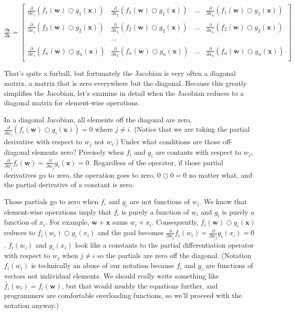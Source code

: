 \documentclass[11pt]{article}
\begin{document}
$
\frac{\partial \mathbf{y}}{\partial \mathbf{x}}  = \begin{bmatrix}
\frac{\partial}{\partial x_1} ( f_{1}(\mathbf{w}) \bigcirc g_{1}(\mathbf{x}) ) & \frac{\partial}{\partial x_2} ( f_{1}(\mathbf{w}) \bigcirc g_{1}(\mathbf{x}) ) & \ldots & \frac{\partial}{\partial x_n} ( f_{1}(\mathbf{w}) \bigcirc g_{1}(\mathbf{x}) )\\\\
\frac{\partial}{\partial x_1} ( f_{2}(\mathbf{w}) \bigcirc g_{2}(\mathbf{x}) ) & \frac{\partial}{\partial x_2} ( f_{2}(\mathbf{w}) \bigcirc g_{2}(\mathbf{x}) ) & \ldots & \frac{\partial}{\partial x_n} ( f_{2}(\mathbf{w}) \bigcirc g_{2}(\mathbf{x}) )\\\\
& \ldots\\\\
\frac{\partial}{\partial x_1} ( f_{n}(\mathbf{w}) \bigcirc g_{n}(\mathbf{x}) ) & \frac{\partial}{\partial x_2} ( f_{n}(\mathbf{w}) \bigcirc g_{n}(\mathbf{x}) ) & \ldots & \frac{\partial}{\partial x_n} ( f_{n}(\mathbf{w}) \bigcirc g_{n}(\mathbf{x}) )\\
\end{bmatrix}
$

That's quite a furball, but fortunately the Jacobian is very often a diagonal matrix, a matrix that is zero everywhere but the diagonal. Because this greatly simplifies the Jacobian, let's examine in detail when the Jacobian reduces to a diagonal matrix for element-wise operations. 

In a diagonal Jacobian, all elements off the diagonal are zero, $\frac{\partial}{\partial w_j} ( f_i(\mathbf{w}) \bigcirc g_i(\mathbf{x}) ) = 0$ where $j \neq i$. (Notice that we are taking the partial derivative with respect to $w_j$ not $w_i$.) Under what conditions are those off-diagonal elements zero? Precisely when $f_i$ and $g_i$ are contants with respect to $w_j$, $\frac{\partial}{\partial w_j} f_i(\mathbf{w}) = \frac{\partial}{\partial w_j} g_i(\mathbf{x}) = 0$.  Regardless of the operator, if those partial derivatives go to zero, the operation goes to zero, $0 \bigcirc 0 = 0$ no matter what, and the partial derivative of a constant is zero.

Those partials go to zero when $f_i$ and $g_i$ are not functions of $w_j$. We know that element-wise operations imply that $f_i$ is purely a function of $w_i$ and $g_i$  is purely a function of $x_i$. For example, $\mathbf{w}+\mathbf{x}$ sums $w_i + x_i$. Consequently,  $f_i(\mathbf{w}) \bigcirc g_i(\mathbf{x})$ reduces to $f_i(w_i) \bigcirc g_i(x_i)$ and the goal becomes $\frac{\partial}{\partial w_j} f_i(w_i) = \frac{\partial}{\partial w_j} g_i(x_i) = 0$. $f_i(w_i)$ and $g_i(x_i)$ look like a constants to the partial differentiation operator with respect to $w_j$ when $j \neq i$ so the partials are zero off the diagonal. (Notation $f_i(w_i)$ is technically an abuse of our notation because $f_i$ and $g_i$ are functions of vectors not individual elements. We should really write something like $\hat f_{i}(w_i) = f_{i}(\mathbf{w})$, but that would muddy the equations further, and programmers are comfortable overloading functions, so we'll proceed with the notation anyway.)  
\end{document}
